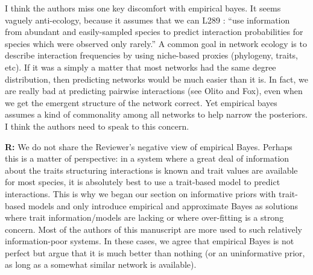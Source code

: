 \documentclass[12pt]{letter}
\newenvironment{refquote}{\bigskip \begin{it}}{\end{it}\smallskip}
\begin{document}
		\begin{refquote}

			I think the authors miss one key discomfort with empirical bayes. It seems vaguely anti-ecology, because it assumes that we can L289 : “use information from abundant and easily-sampled species to predict interaction probabilities for species which were observed only rarely.”  A common goal in network ecology is to describe interaction frequencies by using niche-based proxies (phylogeny, traits, etc). If it was a simply a matter that most networks had the same degree distribution, then predicting networks would be much easier than it is. In fact, we are really bad at predicting pairwise interactions (see Olito and Fox), even when we get the emergent structure of the network correct. Yet empirical bayes assumes a kind of commonality among all networks to help narrow the posteriors. I think the authors need to speak to this concern.

		\end{refquote}


		\textbf{R:} We do not share the Reviewer's negative view of empirical Bayes. Perhaps this is a matter of perspective: in a system where a great deal of information about the traits structuring interactions is known and trait values are available for most species, it is absolutely best to use a trait-based model to predict interactions. This is why we began our section on informative priors with trait-based models and only introduce empirical and approximate Bayes as solutions where trait information/models are lacking or where over-fitting is a strong concern. Most of the authors of this manuscript are more used to such relatively information-poor systems. In these cases, we agree that empirical Bayes is not perfect but argue that it is much better than nothing (or an uninformative prior, as long as a somewhat similar network is available).
\end{document}
